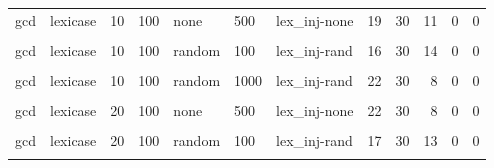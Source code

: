 \documentclass[
]{book}
\begin{document}
\begin{table}
\begin{tabular}{l|l|l|l|l|l|l|r|r|r|r|r}
\hline
\cellcolor{gray!6}{gcd} & \cellcolor{gray!6}{lexicase} & \cellcolor{gray!6}{10} & \cellcolor{gray!6}{100} & \cellcolor{gray!6}{none} & \cellcolor{gray!6}{100} & \cellcolor{gray!6}{lex\_inj-none} & \cellcolor{gray!6}{18} & \cellcolor{gray!6}{30} & \cellcolor{gray!6}{12} & \cellcolor{gray!6}{0} & \cellcolor{gray!6}{0}\\
\hline
gcd & lexicase & 10 & 100 & none & 500 & lex\_inj-none & 19 & 30 & 11 & 0 & 0\\
\hline
\cellcolor{gray!6}{gcd} & \cellcolor{gray!6}{lexicase} & \cellcolor{gray!6}{10} & \cellcolor{gray!6}{100} & \cellcolor{gray!6}{none} & \cellcolor{gray!6}{1000} & \cellcolor{gray!6}{lex\_inj-none} & \cellcolor{gray!6}{21} & \cellcolor{gray!6}{30} & \cellcolor{gray!6}{9} & \cellcolor{gray!6}{0} & \cellcolor{gray!6}{0}\\
\hline
gcd & lexicase & 10 & 100 & random & 100 & lex\_inj-rand & 16 & 30 & 14 & 0 & 0\\
\hline
\cellcolor{gray!6}{gcd} & \cellcolor{gray!6}{lexicase} & \cellcolor{gray!6}{10} & \cellcolor{gray!6}{100} & \cellcolor{gray!6}{random} & \cellcolor{gray!6}{500} & \cellcolor{gray!6}{lex\_inj-rand} & \cellcolor{gray!6}{22} & \cellcolor{gray!6}{30} & \cellcolor{gray!6}{8} & \cellcolor{gray!6}{0} & \cellcolor{gray!6}{0}\\
\hline
gcd & lexicase & 10 & 100 & random & 1000 & lex\_inj-rand & 22 & 30 & 8 & 0 & 0\\
\hline
\cellcolor{gray!6}{gcd} & \cellcolor{gray!6}{lexicase} & \cellcolor{gray!6}{20} & \cellcolor{gray!6}{100} & \cellcolor{gray!6}{none} & \cellcolor{gray!6}{100} & \cellcolor{gray!6}{lex\_inj-none} & \cellcolor{gray!6}{22} & \cellcolor{gray!6}{30} & \cellcolor{gray!6}{8} & \cellcolor{gray!6}{0} & \cellcolor{gray!6}{0}\\
\hline
gcd & lexicase & 20 & 100 & none & 500 & lex\_inj-none & 22 & 30 & 8 & 0 & 0\\
\hline
\cellcolor{gray!6}{gcd} & \cellcolor{gray!6}{lexicase} & \cellcolor{gray!6}{20} & \cellcolor{gray!6}{100} & \cellcolor{gray!6}{none} & \cellcolor{gray!6}{1000} & \cellcolor{gray!6}{lex\_inj-none} & \cellcolor{gray!6}{19} & \cellcolor{gray!6}{30} & \cellcolor{gray!6}{11} & \cellcolor{gray!6}{0} & \cellcolor{gray!6}{0}\\
\hline
gcd & lexicase & 20 & 100 & random & 100 & lex\_inj-rand & 17 & 30 & 13 & 0 & 0\\
\hline
\cellcolor{gray!6}{gcd} & \cellcolor{gray!6}{lexicase} & \cellcolor{gray!6}{20} & \cellcolor{gray!6}{100} & \cellcolor{gray!6}{random} & \cellcolor{gray!6}{500} & \cellcolor{gray!6}{lex\_inj-rand} & \cellcolor{gray!6}{17} & \cellcolor{gray!6}{30} & \cellcolor{gray!6}{13} & \cellcolor{gray!6}{0} & \cellcolor{gray!6}{0}\\

\end{tabular}
\end{table}
\end{document}
